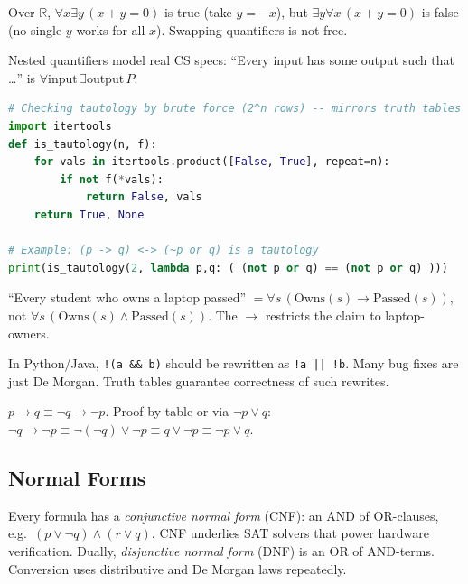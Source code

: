 \begin{example}
Over $\mathbb{R}$, $\forall x\exists y\,(x+y=0)$ is true (take $y=-x$), but $\exists y\forall x\,(x+y=0)$ is false (no single $y$ works for all $x$). Swapping quantifiers is not free.
\end{example}

Nested quantifiers model real CS specs: ``Every input has some output such that \dots'' is $\forall\text{input}\,\exists\text{output}\,P$.


\begin{lstlisting}[language=Python]
# Checking tautology by brute force (2^n rows) -- mirrors truth tables
import itertools
def is_tautology(n, f):
    for vals in itertools.product([False, True], repeat=n):
        if not f(*vals):
            return False, vals
    return True, None

# Example: (p -> q) <-> (~p or q) is a tautology
print(is_tautology(2, lambda p,q: ( (not p or q) == (not p or q) )))
\end{lstlisting}

\begin{remark}
``Every student who owns a laptop passed'' $=\forall s\,(\text{Owns}(s)\to\text{Passed}(s))$, not $\forall s\,(\text{Owns}(s)\land\text{Passed}(s))$. The $\to$ restricts the claim to laptop-owners.
\end{remark}


\begin{example}
In Python/Java, \texttt{!(a \&\& b)} should be rewritten as \texttt{!a || !b}. Many bug fixes are just De Morgan. Truth tables guarantee correctness of such rewrites.
\end{example}

\begin{lemma}
$p\to q\equiv\neg q\to\neg p$. Proof by table or via $\neg p\lor q$: $\neg q\to\neg p\equiv\neg(\neg q)\lor\neg p\equiv q\lor\neg p\equiv\neg p\lor q$.
\end{lemma}

\subsection{Normal Forms}
Every formula has a \emph{conjunctive normal form} (CNF): an AND of OR-clauses, e.g.\ $(p\lor\neg q)\land(r\lor q)$. CNF underlies SAT solvers that power hardware verification. Dually, \emph{disjunctive normal form} (DNF) is an OR of AND-terms. Conversion uses distributive and De Morgan laws repeatedly.



